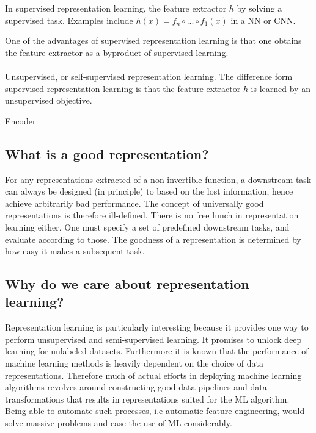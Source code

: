 \documentclass[../../thesis.tex]{subfiles}
\begin{document}
In supervised representation learning, the feature extractor $h$ by solving a supervised task.  Examples include $h(x) = f_n\circ ...\circ f_1(x)$ in a NN or CNN.

One of the advantages of supervised representation learning is that one obtains the feature extractor as a byproduct of supervised learning. 
\\\\

Unsupervised, or self-supervised representation learning. The difference form supervised representation learning is that the feature extractor $h$ is learned by an unsupervised objective. 

Encoder 



\subsection{What is a good representation?}

For any representations extracted of a non-invertible function, a downstream task can always be designed (in principle) to based on the lost information, hence achieve arbitrarily bad performance. The concept of universally good representations is therefore ill-defined. There is no free lunch in representation learning either. One must specify a set of predefined downstream tasks, and evaluate according to those. The goodness of a representation is determined by how easy it makes a subsequent task.

\subsection{Why do we care about representation learning?}

Representation learning is particularly interesting because it provides one way to perform unsupervised and semi-supervised learning. It promises to unlock deep learning for unlabeled datasets. Furthermore it is known that the performance of machine learning methods is heavily dependent on the choice of data representations. Therefore much of actual efforts in deploying machine learning algorithms revolves around constructing good data pipelines and data transformations that results in representations suited for the ML algorithm. Being able to automate such processes, i.e automatic feature engineering, would solve massive problems and ease the use of ML considerably. 

\end{document}

